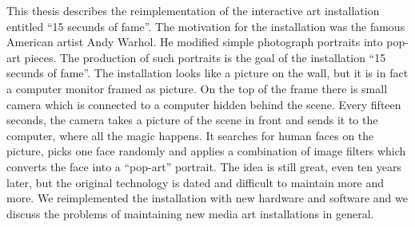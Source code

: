 This thesis describes the reimplementation of the interactive art installation entitled
``15 secunds of fame''. The motivation for the installation was
the famous American artist Andy Warhol. He modified simple photograph portraits into pop-art pieces. The production of such portraits is the goal of the installation ``15 secunds of fame''. The installation looks like a picture on the wall, but it is in fact a computer monitor framed as picture. On the top of the frame there is small camera which
is connected to a computer hidden behind the scene. Every fifteen seconds, the
camera takes a picture of the scene in front and sends it to the computer, where all the
magic happens. It searches for human faces on the picture, picks one face randomly and applies a
combination of image filters which converts the face into a ``pop-art''
portrait. The idea is still great, even ten years later, but the original technology
is dated and difficult to maintain more and more. We reimplemented the installation with new hardware and software and we discuss the problems of maintaining new media art installations in general.
